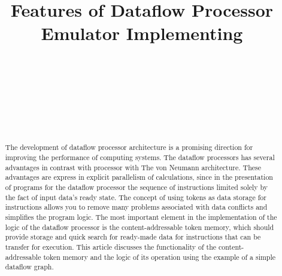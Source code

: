 \documentclass[
11pt,%
tightenlines,%
twoside,%
onecolumn,%
nofloats,%
nobibnotes,%
nofootinbib,%
superscriptaddress,%
noshowpacs,%
centertags]%
{revtex4}
\begin{document}

\title{Features of Dataflow Processor Emulator Implementing}

\author{~}

\author{~}

\author{~}

\author{~}



\begin{abstract}
The development of dataflow processor architecture is a promising direction for improving the performance of computing systems. The dataflow processors has several advantages in contrast with processor with The von Neumann architecture. These advantages are express in explicit parallelism of calculations, since in the presentation of programs for the dataflow processor the sequence of instructions limited solely by the fact of input data’s ready state. The concept of using tokens as data storage for instructions allows you to remove many problems associated with data conflicts and simplifies the program logic. The most important element in the implementation of the logic of the dataflow processor is the content-addressable token memory, which should provide storage and quick search for ready-made data for instructions that can be transfer for execution. This article discusses the functionality of the content-addressable token memory and the logic of its operation using the example of a simple dataflow graph.
\end{abstract}
\end{document}
